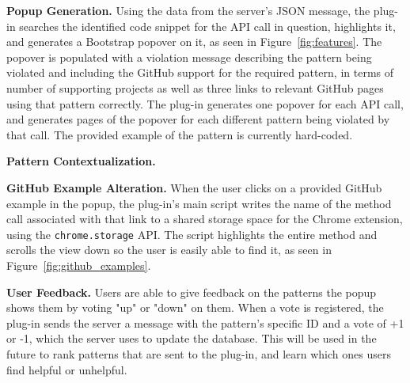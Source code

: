 {\bf Popup Generation.} Using the data from the server's JSON message, the plug-in searches the identified code snippet for the API call in question, highlights it, and generates a Bootstrap popover on it, as seen in Figure~\ref{fig:features}. The popover is populated with a violation message describing the pattern being violated and including the GitHub support for the required pattern, in terms of number of supporting projects as well as three links to relevant GitHub pages using that pattern correctly. The plug-in generates one popover for each API call, and generates pages of the popover for each different pattern being violated by that call. The provided example of the pattern is currently hard-coded.

{\bf Pattern Contextualization.} 

{\bf GitHub Example Alteration.} When the user clicks on a provided GitHub example in the popup, the plug-in's main script writes the name of the method call associated with that link to a shared storage space for the Chrome extension, using the {\tt chrome.storage} API. The script highlights the entire method and scrolls the view down so the user is easily able to find it, as seen in Figure~\ref{fig:github_examples}.

{\bf User Feedback.} Users are able to give feedback on the patterns the popup shows them by voting "up" or "down" on them. When a vote is registered, the plug-in sends the server a message with the pattern's specific ID and a vote of +1 or -1, which the server uses to update the database. This will be used in the future to rank patterns that are sent to the plug-in, and learn which ones users find helpful or unhelpful.